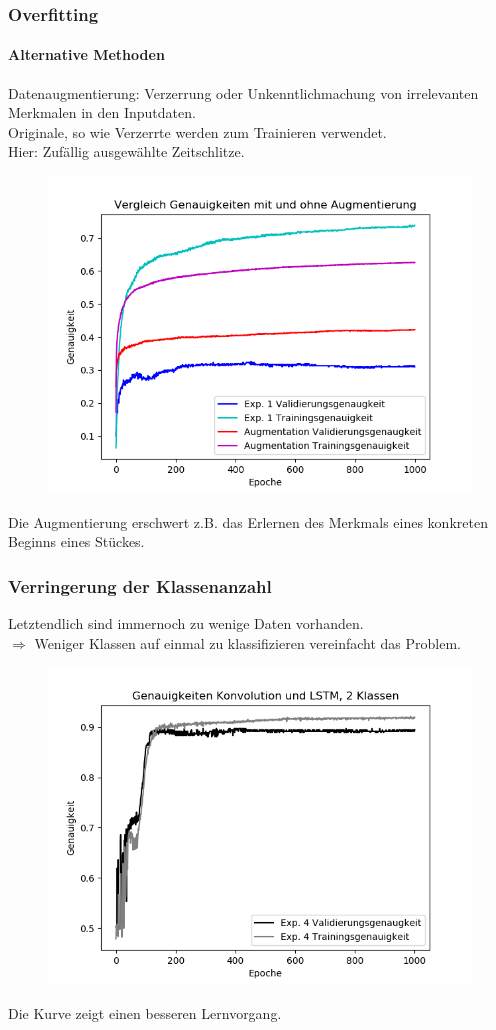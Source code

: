 \documentclass{beamer}
\begin{document}
\frame
{
	\frametitle{Overfitting}
	\framesubtitle{Alternative Methoden}
	Datenaugmentierung: Verzerrung oder Unkenntlichmachung von irrelevanten Merkmalen in den Inputdaten.\\
	Originale, so wie Verzerrte werden zum Trainieren verwendet.\\
	Hier: Zufällig ausgewählte Zeitschlitze.
	\begin{figure}[h!]
		\centering
		\includegraphics[width=0.5\linewidth,height=0.5\textheight, keepaspectratio]{res/old/augmentation.png}
	\end{figure}
	Die Augmentierung erschwert z.B. das Erlernen des Merkmals eines konkreten Beginns eines Stückes.
}

\frame
{
	\frametitle{Verringerung der Klassenanzahl}
	Letztendlich sind immernoch zu wenige Daten vorhanden.\\
	$\Rightarrow$ Weniger Klassen auf einmal zu klassifizieren vereinfacht das Problem.
	\begin{figure}[h!]
		\centering
		\includegraphics[width=0.5\linewidth,height=0.5\textheight, keepaspectratio]{res/old/conv_lstm.png}
	\end{figure}
	Die Kurve zeigt einen besseren Lernvorgang.
}
\end{document}
